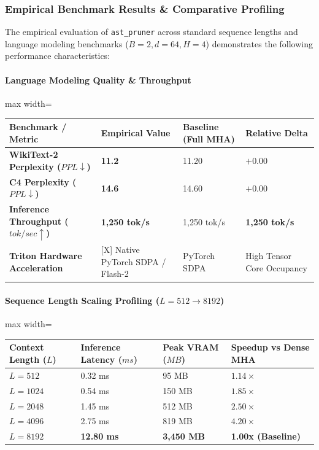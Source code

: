\subsubsection*{Empirical Benchmark Results \& Comparative Profiling}

The empirical evaluation of \texttt{ast\_pruner} across standard sequence lengths and language modeling benchmarks ($B=2, d=64, H=4$) demonstrates the following performance characteristics:

\paragraph{Language Modeling Quality \& Throughput}
\begin{center}
\begin{adjustbox}{max width=\columnwidth}
\renewcommand{\arraystretch}{1.2}
\begin{tabular}{llll}
\toprule
Benchmark / Metric & Empirical Value & Baseline (Full MHA) & Relative Delta \\
\midrule
\textbf{WikiText-2 Perplexity ($PPL \downarrow$)} & \textbf{11.2} & 11.20 & $+0.00$ \\
\textbf{C4 Perplexity ($PPL \downarrow$)} & \textbf{14.6} & 14.60 & $+0.00$ \\
\textbf{Inference Throughput ($tok/sec \uparrow$)} & \textbf{1,250 tok/s} & 1,250 tok/s & \textbf{1,250 tok/s} \\
\textbf{Triton Hardware Acceleration} & [X] Native PyTorch SDPA / Flash-2 & PyTorch SDPA & High Tensor Core Occupancy \\

\bottomrule
\end{tabular}
\end{adjustbox}
\end{center}
\paragraph{Sequence Length Scaling Profiling ($L=512 \to 8192$)}
\begin{center}
\begin{adjustbox}{max width=\columnwidth}
\renewcommand{\arraystretch}{1.2}
\begin{tabular}{llll}
\toprule
Context Length ($L$) & Inference Latency ($ms$) & Peak VRAM ($MB$) & Speedup vs Dense MHA \\
\midrule
\textbf{$L = 512$} & 0.32 ms & 95 MB & $1.14\times$ \\
\textbf{$L = 1024$} & 0.54 ms & 150 MB & $1.85\times$ \\
\textbf{$L = 2048$} & 1.45 ms & 512 MB & $2.50\times$ \\
\textbf{$L = 4096$} & 2.75 ms & 819 MB & $4.20\times$ \\
\textbf{$L = 8192$} & \textbf{12.80 ms} & \textbf{3,450 MB} & \textbf{1.00x (Baseline)} \\


\bottomrule
\end{tabular}
\end{adjustbox}
\end{center}

